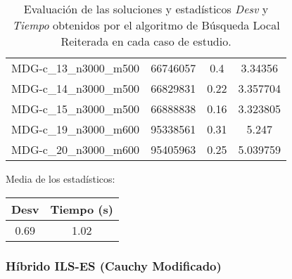 \documentclass{article}
\begin{document}
\begin{table}[H]
\begin{tabular}{|cccc|}
		MDG-c\_13\_n3000\_m500 & 66746057 & 0.4 & 3.34356\\
		MDG-c\_14\_n3000\_m500 & 66829831 & 0.22 & 3.357704\\
		MDG-c\_15\_n3000\_m500 & 66888838 & 0.16 & 3.323805\\
		MDG-c\_19\_n3000\_m600 & 95338561 & 0.31 & 5.247\\
		MDG-c\_20\_n3000\_m600 & 95405963 & 0.25 & 5.039759\\
		\hline
	\end{tabular}
	\caption{Evaluación de las soluciones y estadísticos \emph{Desv} y \emph{Tiempo} obtenidos por el algoritmo de Búsqueda Local Reiterada en cada caso de estudio.}
	\label{tab:ils}
\end{table}

Media de los estadísticos:
\begin{table}[H]
	\centering
	\begin{tabular}{|cc|}
		\hline
		Desv & Tiempo (s)\\ \hline
		0.69 & 1.02 \\
		\hline
	\end{tabular}
\end{table}

\pagebreak

\subsubsection*{Híbrido ILS-ES (Cauchy Modificado)}
\end{document}
